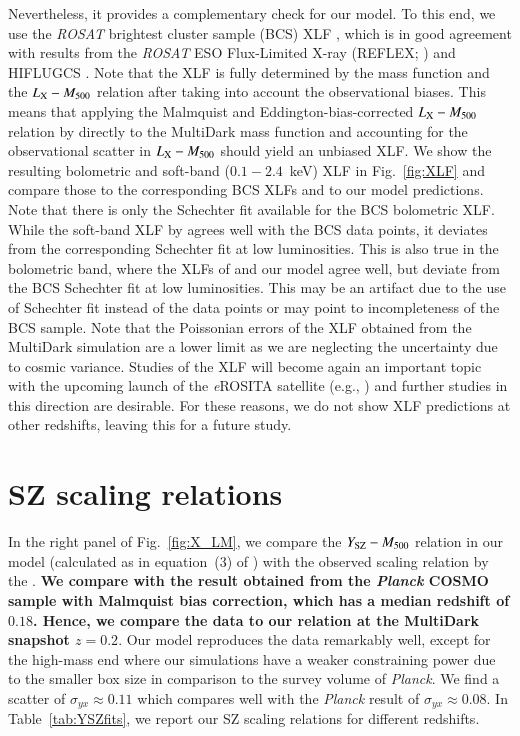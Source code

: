 \documentclass[useAMS,usenatbib]{mn2e}
\begin{document}
Nevertheless, it provides a complementary check for our model. To this end, we
use the \emph{ROSAT} brightest cluster sample (BCS) XLF
\citep{1997ApJ...479L.101E}, which is in good agreement with results from the
\emph{ROSAT} ESO Flux-Limited X-ray (REFLEX; \citealp{2002ApJ...566...93B}) and
HIFLUGCS \citep{2002ApJ...567..716R}.  Note that the XLF is fully determined by
the mass function and the $L_{{\mathrm{X}}}-M_{500}$ relation after taking into
account the observational biases. This means that applying the Malmquist and
Eddington-bias-corrected $L_{{\mathrm{X}}}-M_{500}$ relation by
\cite{2010MNRAS.406.1773M} directly to the MultiDark mass function and
accounting for the observational scatter in $L_{{\mathrm{X}}}-M_{500}$ should yield
an unbiased XLF. We show the resulting bolometric and soft-band ($0.1-2.4$~keV)
XLF in Fig.~\ref{fig:XLF} and compare those to the corresponding BCS XLFs and
to our model predictions. Note that there is only the Schechter fit available
for the BCS bolometric XLF.  While the soft-band XLF by
\cite{2010MNRAS.406.1773M} agrees well with the BCS data points, it deviates
from the corresponding Schechter fit at low luminosities. This is also true in
the bolometric band, where the XLFs of \cite{2010MNRAS.406.1773M} and our model
agree well, but deviate from the BCS Schechter fit at low luminosities. This may
be an artifact due to the use of Schechter fit instead of the data points or may
point to incompleteness of the BCS sample. Note that the Poissonian errors of
the XLF obtained from the MultiDark simulation are a lower limit as we are
neglecting the uncertainty due to cosmic variance.  Studies of the XLF will
become again an important topic with the upcoming launch of the \emph{e}ROSITA
satellite (e.g., \citealp{2011MSAIS..17..159C}) and further studies in this
direction are desirable. For these reasons, we do not show XLF predictions at
other redshifts, leaving this for a future study.


\section{SZ scaling relations}
\label{sec:5}
In the right panel of Fig.~\ref{fig:X_LM}, we compare the
$Y_{{\mathrm{SZ}}}-M_{500}$ relation in our model (calculated as in equation~(3) of
\citealp{2011arXiv1109.3709B}) with the observed scaling relation by the
\cite{2013arXiv1303.5080P}. {\bf We compare with the result obtained from the 
\emph{Planck} COSMO sample with Malmquist bias correction,
which has a median redshift of $0.18$. Hence, we compare the data to our relation 
at the MultiDark snapshot $z=0.2$}. Our model reproduces the data remarkably well, except 
for the high-mass end where our simulations have a weaker constraining power due to the 
smaller box size in comparison to the survey volume of {\em Planck}. We find a scatter of
$\sigma_{yx} \approx 0.11$ which compares well with the \emph{Planck} result of
$\sigma_{yx} \approx 0.08$. In Table~\ref{tab:YSZfits}, we report our SZ scaling
relations for different redshifts.
\end{document}
